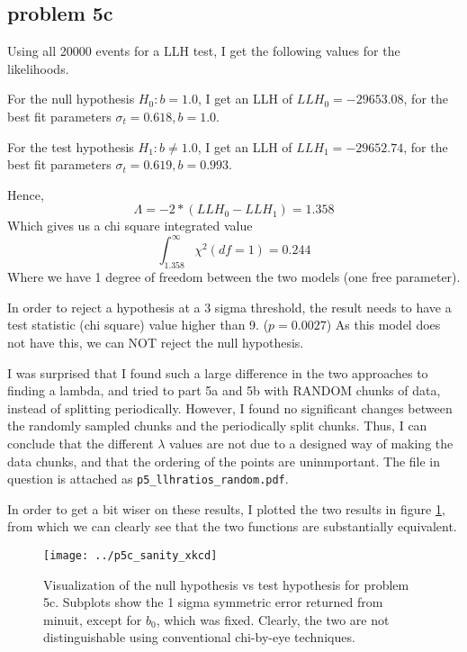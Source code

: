 \documentclass[a4paper,11pt]{article}
\begin{document}
\subsection{problem 5c }
Using all 20000 events for a LLH test, I get the following values for the likelihoods.

For the null hypothesis \( H_0 : b = 1.0 \), I get an LLH of \(LLH_0 = -29653.08\), for the best fit parameters \(\sigma_t = 0.618, b = 1.0  \).

For the test hypothesis \( H_1 : b \neq 1.0 \), I get an LLH of \(LLH_1 = -29652.74\), for the best fit parameters \(\sigma_t = 0.619, b = 0.993 \).

Hence,
\[
\Lambda = -2 * ( LLH_0 - LLH_1 ) = 1.358
\]
Which gives us a chi square integrated value \[\int_{1.358}^{\infty}\chi^2(df= 1) = 0.244\]
Where we have 1 degree of freedom between the two models (one free parameter).

In order to reject a hypothesis at a 3 sigma threshold, the result needs to have a test statistic (chi square) value higher than 9. ($p = 0.0027$)
As this model does not have this, we can NOT reject the null hypothesis.

I was surprised that I found such a large difference in the two approaches to finding a lambda, and tried to part 5a and 5b with RANDOM chunks of data, instead of splitting periodically.
However, I found no significant changes between the randomly sampled chunks and the periodically split chunks.
Thus, I can conclude that the different $\lambda$ values are not due to a designed way of making the data chunks, and that the ordering of the points are uninmportant.
The file in question is attached as \verb|p5_llhratios_random.pdf|.

In order to get a bit wiser on these results, I plotted the two results in figure \ref{p5_sanit}, from which we can clearly see that the two functions are substantially equivalent.
\begin{figure}
  \texttt{[image: ../p5c\_sanity\_xkcd]}
  \caption{Visualization of the null hypothesis vs test hypothesis for problem 5c. Subplots show the 1 sigma symmetric error returned from minuit, except for $b_0$, which was fixed.
  Clearly, the two are not distinguishable using conventional chi-by-eye techniques. }
  \label{p5_sanit}
\end{figure}
\end{document}
